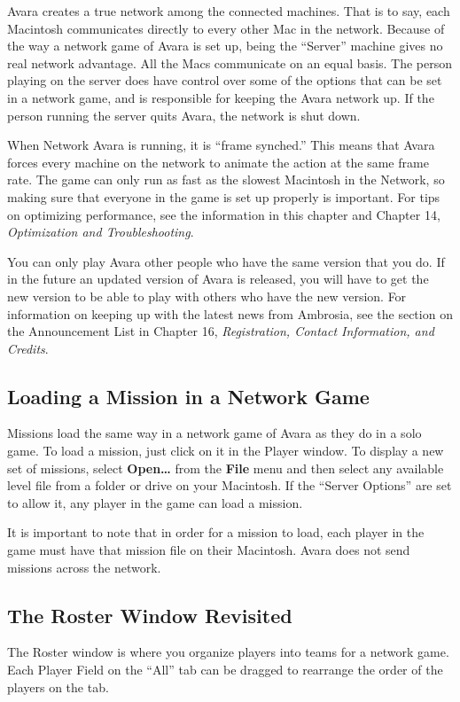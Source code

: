 \documentclass{article}
\begin{document}
Avara creates a true network among the connected machines. That is to say, each Macintosh communicates directly to every other Mac in the network. Because of the way a network game of Avara is set up, being the ``Server'' machine gives no real network advantage. All the Macs communicate on an equal basis. The person playing on the server does have control over some of the options that can be set in a network game, and is responsible for keeping the Avara network up. If the person running the server quits Avara, the network is shut down.

When Network Avara is running, it is ``frame synched.'' This means that Avara forces every machine on the network to animate the action at the same frame rate. The game can only run as fast as the slowest Macintosh in the Network, so making sure that everyone in the game is set up properly is important. For tips on optimizing performance, see the information in this chapter and Chapter 14, \textit{Optimization and Troubleshooting}.

You can only play Avara other people who have the same version that you do. If in the future an updated version of Avara is released, you will have to get the new version to be able to play with others who have the new version. For information on keeping up with the latest news from Ambrosia, see the section on the Announcement List in Chapter 16, \textit{Registration, Contact Information, and Credits}.

\subsection{Loading a Mission in a Network Game}
Missions load the same way in a network game of Avara as they do in a solo game. To load a mission, just click on it in the Player window. To display a new set of missions, select \textbf{Open\dots} from the \textbf{File} menu and then select any available level file from a folder or drive on your Macintosh. If the ``Server Options'' are set to allow it, any player in the game can load a mission.

It is important to note that in order for a mission to load, each player in the game must have that mission file on their Macintosh. Avara does not send missions across the network.

\subsection{The Roster Window Revisited}
The Roster window is where you organize players into teams for a network game. Each Player Field on the ``All'' tab can be dragged to rearrange the order of the players on the tab.
\end{document}
